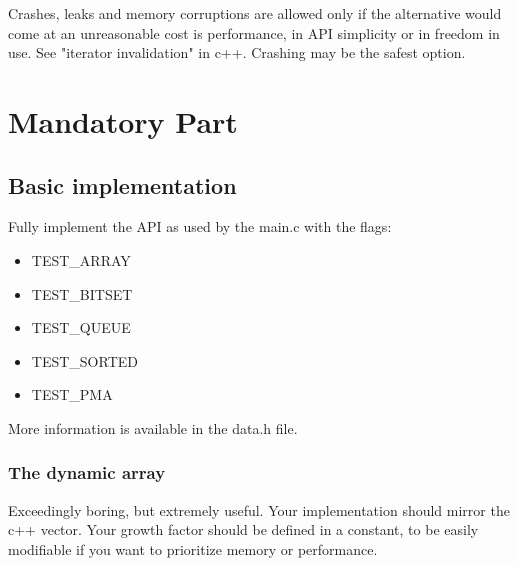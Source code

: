 \documentclass{42-en}
\begin{document}
    Crashes, leaks and memory corruptions are allowed only if the alternative would come at
    an unreasonable cost is performance, in API simplicity or in freedom in use. See "iterator
    invalidation" in c++. Crashing may be the safest option.\\
    


\chapter{Mandatory Part}

    \section{Basic implementation}
        Fully implement the API as used by the main.c with the flags:

        \begin{itemize}\itemsep7pt
            \item TEST\_ARRAY
            \item TEST\_BITSET
            \item TEST\_QUEUE
            \item TEST\_SORTED
            \item TEST\_PMA
        \end{itemize}

        More information is available in the data.h file.

        \subsection{The dynamic array}
        Exceedingly boring, but extremely useful.
        Your implementation should mirror the c++ vector. Your growth factor should
        be defined in a constant, to be easily modifiable if you want to prioritize
        memory or performance.
\end{document}
